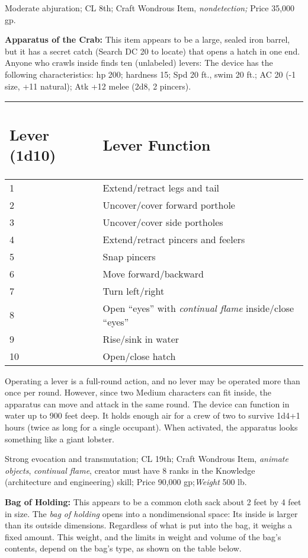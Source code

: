 \documentclass{article}
\begin{document}
Moderate abjuration; CL 8th; Craft Wondrous Item, \textit{nondetection; }Price 
35,000 gp.

\textbf{Apparatus of the Crab:} This item appears to be a large, sealed iron barrel, 
but it has a secret catch (Search DC 20 to locate) that opens a hatch in one end. 
Anyone who crawls inside finds ten (unlabeled) levers: The device has the following 
characteristics: hp 200; hardness 15; Spd 20 ft., swim 20 ft.; AC 20 (-1 size, 
+11 natural); Atk +12 melee (2d8, 2 pincers).

\begin{tabular}{|>{\raggedright}p{26pt}|>{\raggedright}p{184pt}|}
\hline
\subsection*{L\textbf{ever (1d10)}} & \subsection*{L\textbf{ever Function}}\tabularnewline
\hline
1 & Extend/retract legs and tail\tabularnewline
\hline
2 & Uncover/cover forward porthole\tabularnewline
\hline
3 & Uncover/cover side portholes\tabularnewline
\hline
4 & Extend/retract pincers and feelers\tabularnewline
\hline
5 & Snap pincers\tabularnewline
\hline
6 & Move forward/backward\tabularnewline
\hline
7 & Turn left/right\tabularnewline
\hline
8 & Open ``eyes'' with \textit{continual flame }inside/close ``eyes''\tabularnewline
\hline
9 & Rise/sink in water\tabularnewline
\hline
10 & Open/close hatch\tabularnewline
\hline
\end{tabular}

\vspace{12pt}
Operating a lever is a full-round action, and no lever may be operated more than 
once per round. However, since two Medium characters can fit inside, the apparatus 
can move and attack in the same round. The device can function in water up to 900 
feet deep. It holds enough air for a crew of two to survive 1d4+1 hours (twice 
as long for a single occupant). When activated, the apparatus looks something like 
a giant lobster.

Strong evocation and transmutation; CL 19th; Craft Wondrous Item, \textit{animate 
objects}, \textit{continual flame}, creator must have 8 ranks in the Knowledge 
(architecture and engineering) skill; Price 90,000 gp;\textit{Weight }500 lb.

\textbf{Bag of Holding:} This appears to be a common cloth sack about 2 feet by 
4 feet in size. The \textit{bag of holding }opens into a nondimensional space: 
Its inside is larger than its outside dimensions. Regardless of what is put into 
the bag, it weighs a fixed amount. This weight, and the limits in weight and volume 
of the bag's contents, depend on the bag's type, as shown on the table below.
\end{document}
